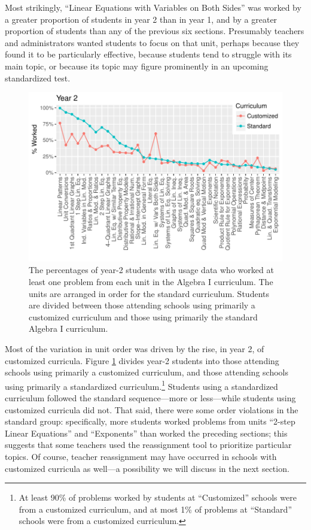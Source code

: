 \documentclass[12pt]{article}\usepackage[]{graphicx}\usepackage[]{color}
\makeatletter
\def\maxwidth{ %
  \ifdim\Gin@nat@width>\linewidth
    \linewidth
  \else
    \Gin@nat@width
  \fi
}
\makeatother
\begin{document}
Most strikingly, ``Linear Equations with Variables on Both Sides'' was worked by a
greater proportion of students in year 2 than in year 1, and by a
greater proportion of students than any of the previous six sections.
Presumably teachers and administrators wanted students to focus on
that unit, perhaps because they found it to be particularly effective,
because students tend to struggle with its main topic, or because its
topic may figure prominently in an upcoming standardized test.

\begin{figure}
  \centering

\includegraphics[width=\maxwidth]{figure/unitsWorkedCust-1} 

\caption{The percentages of year-2 students with usage data who worked at
  least one problem from each unit in the Algebra I curriculum. The
  units are arranged in order for the standard curriculum. Students
  are divided between those attending schools using primarily a customized
  curriculum and those using primarily the standard Algebra I curriculum.}
\label{fig:unitsWorkedCust}
\end{figure}

Most of the variation in unit order was driven by the rise, in year 2,
of customized curricula.
Figure \ref{fig:unitsWorkedCust} divides year-2 students into those
attending schools using primarily a customized curriculum, and those
attending schools using primarily a standardized
curriculum.\footnote{At least
  90\% of
  problems worked by students at ``Customized'' schools were from a customized curriculum,
  and at most
  1\% of
  problems at ``Standard'' schools were from a customized curriculum.}
Students using a standardized curriculum followed the standard
sequence---more or less---while students using customized curricula
did not.
That said, there were some order violations in the standard group:
specifically, more students worked problems from units ``2-step Linear
Equations'' and ``Exponents'' than worked the preceding sections;
this suggests that some teachers used the reassignment tool to
prioritize particular topics.
Of course, teacher reassignment may have occurred in schools with customized
curricula as well---a possibility we will discuss in the next
section.
\end{document}
